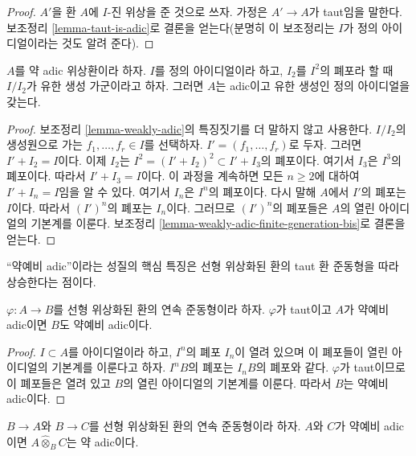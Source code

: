 \begin{proof}
$A'$을 환 $A$에 $I$-진 위상을 준 것으로 쓰자. 가정은
$A' \to A$가 taut임을 말한다. 보조정리
\ref{lemma-taut-is-adic}로 결론을 얻는다(분명히 이 보조정리는
$I$가 정의 아이디얼이라는 것도 알려 준다).
\end{proof}

\begin{lemma}
\label{lemma-weakly-adic-finite-generation}
$A$를 약 adic 위상환이라 하자. $I$를 정의 아이디얼이라 하고,
$I_2$를 $I^2$의 폐포라 할 때 $I/I_2$가 유한 생성 가군이라고 하자.
그러면 $A$는 adic이고 유한 생성인 정의 아이디얼을 갖는다.
\end{lemma}

\begin{proof}
보조정리 \ref{lemma-weakly-adic}의 특징짓기를 더 말하지 않고
사용한다. $I/I_2$의 생성원으로 가는
$f_1, \ldots, f_r \in I$를 선택하자. $I' = (f_1, \ldots, f_r)$로
두자. 그러면 $I' + I_2 = I$이다. 이제 $I_2$는
$I^2 = (I' + I_2)^2 \subset I' + I_3$의 폐포이다. 여기서 $I_3$은
$I^3$의 폐포이다. 따라서 $I' + I_3 = I$이다. 이 과정을 계속하면
모든 $n \geq 2$에 대하여 $I' + I_n = I$임을 알 수 있다. 여기서
$I_n$은 $I^n$의 폐포이다. 다시 말해 $A$에서 $I'$의 폐포는 $I$이다.
따라서 $(I')^n$의 폐포는 $I_n$이다. 그러므로 $(I')^n$의 폐포들은
$A$의 열린 아이디얼의 기본계를 이룬다. 보조정리
\ref{lemma-weakly-adic-finite-generation-bis}로 결론을 얻는다.
\end{proof}

\noindent
``약예비 adic''이라는 성질의 핵심 특징은 선형 위상화된 환의 taut
환 준동형을 따라 상승한다는 점이다.

\begin{lemma}
\label{lemma-taut-ascent-weakly-adic}
$\varphi : A \to B$를 선형 위상화된 환의 연속 준동형이라 하자.
$\varphi$가 taut이고 $A$가 약예비 adic이면 $B$도 약예비 adic이다.
\end{lemma}

\begin{proof}
$I \subset A$를 아이디얼이라 하고, $I^n$의 폐포 $I_n$이 열려 있으며
이 폐포들이 열린 아이디얼의 기본계를 이룬다고 하자. $I^nB$의 폐포는
$I_nB$의 폐포와 같다. $\varphi$가 taut이므로 이 폐포들은 열려 있고
$B$의 열린 아이디얼의 기본계를 이룬다. 따라서 $B$는 약예비
adic이다.
\end{proof}

\begin{lemma}
\label{lemma-completed-tensor-product-weakly-adic}
$B \to A$와 $B \to C$를 선형 위상화된 환의 연속 준동형이라 하자.
$A$와 $C$가 약예비 adic이면 $A \widehat{\otimes}_B C$는 약 adic이다.
\end{lemma}

